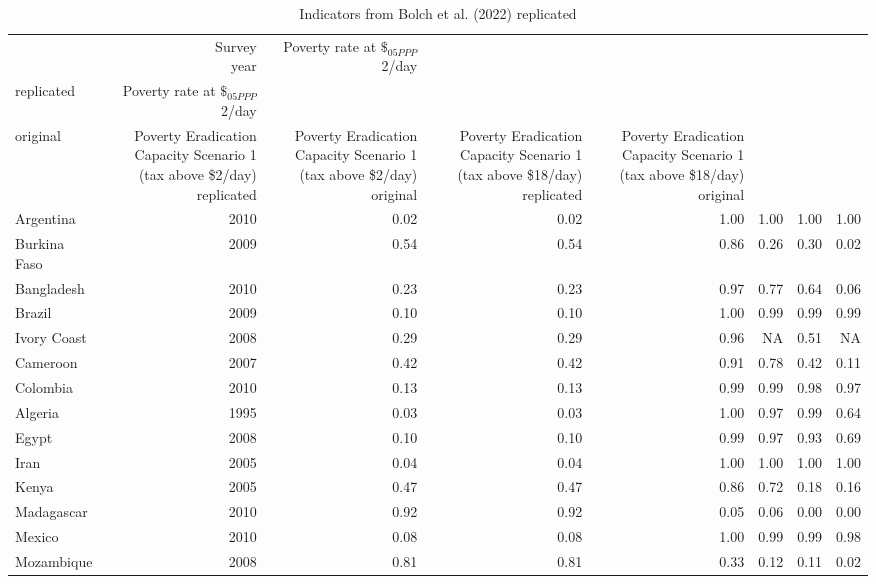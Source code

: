 
\begin{longtable}[t]{lrrrrrrr}
\caption{\label{tab:bolch_replication}Indicators from Bolch et al. (2022) replicated}\\
\toprule
  & \makecell{Survey\\year} & \makecell{Poverty rate\\at $\$_{05PPP}$2}/day\\replicated & \makecell{Poverty rate\\at $\$_{05PPP}$2}/day\\original & \makecell{Poverty Eradication Capacity\\Scenario 1 (tax above \$2/day)\\replicated} & \makecell{Poverty Eradication Capacity\\Scenario 1 (tax above \$2/day)\\original} & \makecell{Poverty Eradication Capacity\\Scenario 1 (tax above \$18/day)\\replicated} & \makecell{Poverty Eradication Capacity\\Scenario 1 (tax above \$18/day)\\original}\\
\midrule
Argentina & 2010 & 0.02 & 0.02 & 1.00 & 1.00 & 1.00 & 1.00\\
Burkina Faso & 2009 & 0.54 & 0.54 & 0.86 & 0.26 & 0.30 & 0.02\\
Bangladesh & 2010 & 0.23 & 0.23 & 0.97 & 0.77 & 0.64 & 0.06\\
Brazil & 2009 & 0.10 & 0.10 & 1.00 & 0.99 & 0.99 & 0.99\\
Ivory Coast & 2008 & 0.29 & 0.29 & 0.96 & NA & 0.51 & NA\\
Cameroon & 2007 & 0.42 & 0.42 & 0.91 & 0.78 & 0.42 & 0.11\\
Colombia & 2010 & 0.13 & 0.13 & 0.99 & 0.99 & 0.98 & 0.97\\
Algeria & 1995 & 0.03 & 0.03 & 1.00 & 0.97 & 0.99 & 0.64\\
Egypt & 2008 & 0.10 & 0.10 & 0.99 & 0.97 & 0.93 & 0.69\\
Iran & 2005 & 0.04 & 0.04 & 1.00 & 1.00 & 1.00 & 1.00\\
Kenya & 2005 & 0.47 & 0.47 & 0.86 & 0.72 & 0.18 & 0.16\\
Madagascar & 2010 & 0.92 & 0.92 & 0.05 & 0.06 & 0.00 & 0.00\\
Mexico & 2010 & 0.08 & 0.08 & 1.00 & 0.99 & 0.99 & 0.98\\
Mozambique & 2008 & 0.81 & 0.81 & 0.33 & 0.12 & 0.11 & 0.02\\

\end{longtable}
